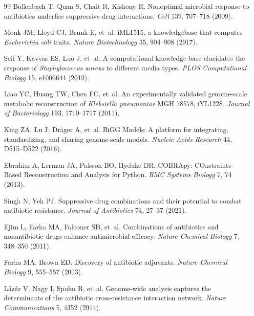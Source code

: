 \documentclass[12pt,a4paper]{article}
\begin{document}
\begin{thebibliography}{99}
Bollenbach T, Quan S, Chait R, Kishony R.
\newblock Nonoptimal microbial response to antibiotics underlies suppressive drug interactions.
\newblock \textit{Cell} 139, 707--718 (2009).

Monk JM, Lloyd CJ, Brunk E, et~al.
\newblock iML1515, a knowledgebase that computes \textit{Escherichia coli} traits.
\newblock \textit{Nature Biotechnology} 35, 904--908 (2017).

Seif Y, Kavvas ES, Luo J, et~al.
\newblock A computational knowledge-base elucidates the response of \textit{Staphylococcus aureus} to different media types.
\newblock \textit{PLOS Computational Biology} 15, e1006644 (2019).

Liao YC, Huang TW, Chen FC, et~al.
\newblock An experimentally validated genome-scale metabolic reconstruction of \textit{Klebsiella pneumoniae} MGH 78578, iYL1228.
\newblock \textit{Journal of Bacteriology} 193, 1710--1717 (2011).

King ZA, Lu J, Dr\"ager A, et~al.
\newblock BiGG Models: A platform for integrating, standardizing, and sharing genome-scale models.
\newblock \textit{Nucleic Acids Research} 44, D515--D522 (2016).

Ebrahim A, Lerman JA, Palsson BO, Hyduke DR.
\newblock COBRApy: COnstraints-Based Reconstruction and Analysis for Python.
\newblock \textit{BMC Systems Biology} 7, 74 (2013).

Singh N, Yeh PJ.
\newblock Suppressive drug combinations and their potential to combat antibiotic resistance.
\newblock \textit{Journal of Antibiotics} 74, 27--37 (2021).

Ejim L, Farha MA, Falconer SB, et~al.
\newblock Combinations of antibiotics and nonantibiotic drugs enhance antimicrobial efficacy.
\newblock \textit{Nature Chemical Biology} 7, 348--350 (2011).

Farha MA, Brown ED.
\newblock Discovery of antibiotic adjuvants.
\newblock \textit{Nature Chemical Biology} 9, 555--557 (2013).

L\'az\'ar V, Nagy I, Spohn R, et~al.
\newblock Genome-wide analysis captures the determinants of the antibiotic cross-resistance interaction network.
\newblock \textit{Nature Communications} 5, 4352 (2014).


\end{thebibliography}
\end{document}
